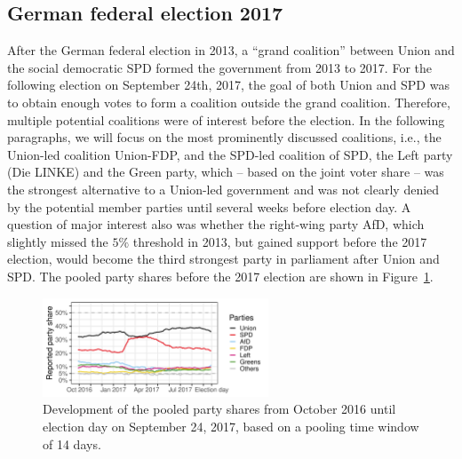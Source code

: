 \documentclass[smallcondensed]{svjour3}     %
\begin{document}



\subsection{German federal election 2017} \label{subsec:2017}
After the German federal election in 2013, a ``grand coalition'' between Union and the social
democratic SPD formed the government from 2013 to 2017.
For the following election on September 24th, 2017, the goal of both Union and SPD
was to obtain enough votes to form a coalition outside the grand
coalition. Therefore, multiple potential coalitions were of interest before the
election. In the following paragraphs, we will focus on the most prominently
discussed coalitions, i.e., the Union-led coalition Union-FDP, and the
SPD-led coalition of SPD, the Left party (Die LINKE) and the Green party, which
-- based on the joint voter share -- was the strongest alternative to a Union-led
government and was not clearly denied by the potential member parties until several weeks
before election day.
A question of major interest also was whether the right-wing party AfD, which
slightly missed the $5\%$ threshold in 2013, but gained support before the 2017 election,
would become the third strongest party in parliament after Union and SPD.
The pooled party shares before the 2017 election are shown in Figure~\ref{fig:2017}.

\begin{figure}[H]\centering
\includegraphics[width=0.6\textwidth]{figures/2017_pooled_rawShares.pdf}
\caption{Development of the pooled party shares from October 2016 until
election day on September 24, 2017, based on a pooling time window of 14 days.
\label{fig:2017}
}
\end{figure}
\end{document}
